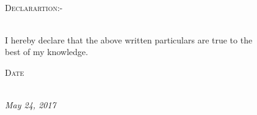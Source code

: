 \documentclass[11pt]{article}
\begin{document}
\begin{figure}[ht]
\begin{minipage}[b]{0.45\linewidth}
\begin{large}
\end{large}
\end{minipage}\\
\vspace{3mm}
\noindent\colorbox{WeakOrange}
{\parbox{\dimexpr\textwidth-2\fboxsep\relax}{\textsc{Declarartion:-}}}\\
\vspace{3mm}
I hereby declare that the above written particulars are true to the best of my knowledge.
\begin{flushright}
\noindent\colorbox{WeakOrange}
{\parbox{\dimexpr\textwidth-2\fboxsep\relax}{\begin{flushright}\textsc{Date}\end{flushright}}}\\
\vspace{3mm}
\textit{May 24, 2017}\\

\end{flushright}
\vspace{10cm}
\end{figure}
\end{document}
